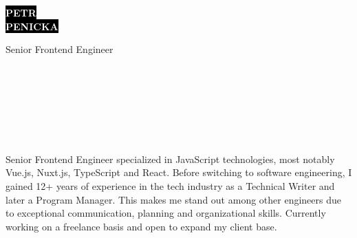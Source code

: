\documentclass[9pt]{developercv}
\begin{document}
\begin{minipage}[t]{0.41\textwidth}
  \vspace{-\baselineskip}

  \colorbox{black}{{\HUGE\textcolor{white}{\textbf{\MakeUppercase{Petr}}}}}
  \\
  \colorbox{black}{{\HUGE\textcolor{white}{\textbf{\MakeUppercase{Penicka}}}}}

  \vspace{6pt}

  {\huge Senior Frontend Engineer}
\end{minipage}
\begin{minipage}[t]{0.275\textwidth}
  \vspace{-\baselineskip}

  \\
  \\
  \\
\end{minipage}
\begin{minipage}[t]{0.34\textwidth}
  \vspace{-\baselineskip}

  \\
  \\
\end{minipage}

\vspace{0.5cm}


\begin{minipage}[t]{1\textwidth}
  \vspace{-\baselineskip}

  {Senior Frontend Engineer specialized in JavaScript technologies, most notably Vue.js, Nuxt.js, TypeScript and React. Before switching to software engineering, I gained 12+ years of experience in the tech industry as a Technical Writer and later a Program Manager. This makes me stand out among other engineers due to exceptional communication, planning and organizational skills. Currently working on a freelance basis and open to expand my client base.}\\
\end{minipage}

\end{document}

